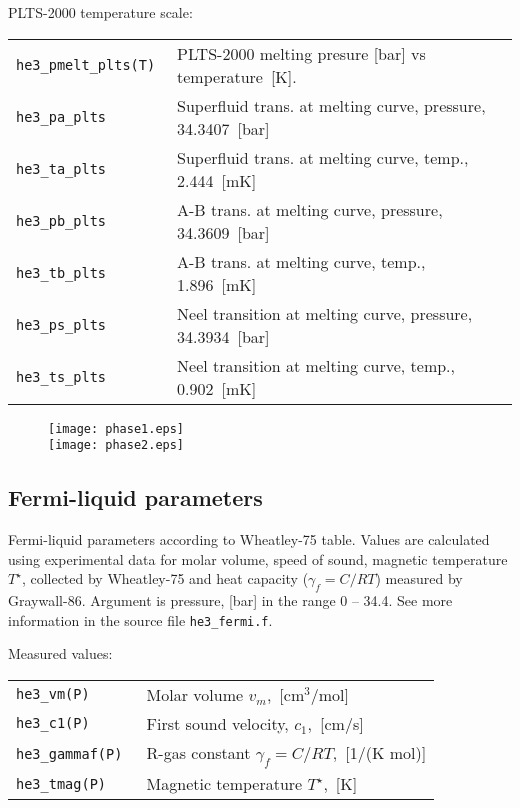 \documentclass[a4paper]{article}
\begin{document}
PLTS-2000 temperature scale:

\medskip
\noindent\begin{tabular}{lp{11cm}}
\tt he3\_pmelt\_plts(T) & PLTS-2000 melting presure [bar] vs temperature~[K].\\
\tt he3\_pa\_plts       & Superfluid trans. at melting curve, pressure, 34.3407~[bar]\\
\tt he3\_ta\_plts       & Superfluid trans. at melting curve, temp., 2.444~[mK]\\
\tt he3\_pb\_plts       & A-B trans. at melting curve, pressure, 34.3609~[bar]\\
\tt he3\_tb\_plts       & A-B trans. at melting curve, temp., 1.896~[mK]\\
\tt he3\_ps\_plts       & Neel transition at melting curve, pressure, 34.3934~[bar]\\
\tt he3\_ts\_plts       & Neel transition at melting curve, temp., 0.902~[mK]\\
\end{tabular}
\medskip

\begin{figure}[p]
\texttt{[image: phase1.eps]}\\
\texttt{[image: phase2.eps]}
\end{figure}

\eject
\subsection*{Fermi-liquid parameters}

Fermi-liquid parameters according to {Wheatley-75} table. Values are
calculated using experimental data for molar volume, speed of sound,
magnetic temperature $T^\star$, collected by {Wheatley-75} and heat
capacity ($\gamma_f=C/RT$) measured by {Graywall-86}. Argument is
pressure, [bar] in the range 0 -- 34.4. See more information in the
source file {\tt he3\_fermi.f}.

\medskip
Measured values:

\medskip
\noindent\begin{tabular}{lp{11cm}}
\tt he3\_vm(P)     & Molar volume $v_m$,~[cm$^3$/mol]\\
\tt he3\_c1(P)     & First sound velocity, $c_1$,~[cm/s]\\
\tt he3\_gammaf(P) & R-gas constant $\gamma_f = C/RT$,~[1/(K mol)]\\
\tt he3\_tmag(P)   & Magnetic temperature $T^\star$,~[K]\newline\\
\end{tabular}
\end{document}
